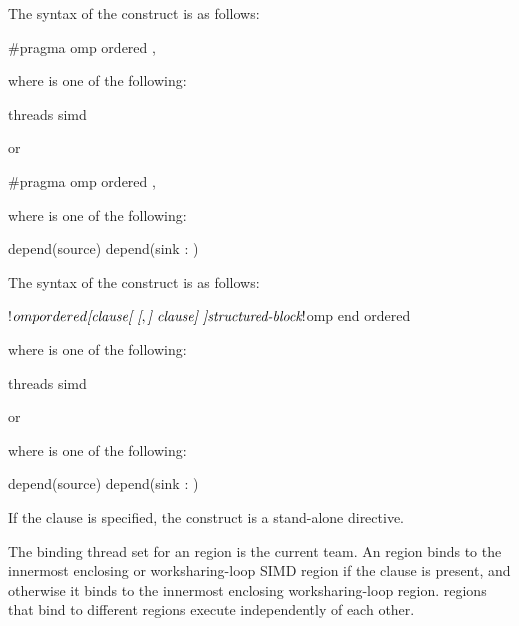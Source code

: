 \syntax
\begin{ccppspecific}
The syntax of the  construct is as follows:

\begin{ompcPragma}
#pragma omp ordered \plc{[clause[ [},\plc{] clause] ]} 
\end{ompcPragma}

where  is one of the following:
\begin{indentedcodelist}
threads
simd
\end{indentedcodelist}

or

\begin{ompcPragma}
#pragma omp ordered \plc{clause [[[},\plc{] clause] ... ]} 
\end{ompcPragma}
where  is one of the following:
\begin{indentedcodelist}
depend(source)
depend(sink : )
\end{indentedcodelist}


\end{ccppspecific}

\begin{fortranspecific}
The syntax of the  construct is as follows:

\begin{ompfPragma}
!$omp ordered \plc{[clause[ [},\plc{] clause] ]}
    \plc{structured-block}
!$omp end ordered
\end{ompfPragma}

where  is one of the following:
\begin{indentedcodelist}
threads
simd
\end{indentedcodelist}

or


where  is one of the following:
\begin{indentedcodelist}
depend(source)
depend(sink : )
\end{indentedcodelist}
\end{fortranspecific}

If the  clause is specified, the  construct is a 
stand-alone directive.

\binding
The binding thread set for an  region is the current team. An 
 region binds to the innermost enclosing  or 
worksharing-loop SIMD region if the  clause is present, and otherwise 
it binds to the innermost enclosing worksharing-loop region.  
regions that bind to different regions execute independently of each other.


